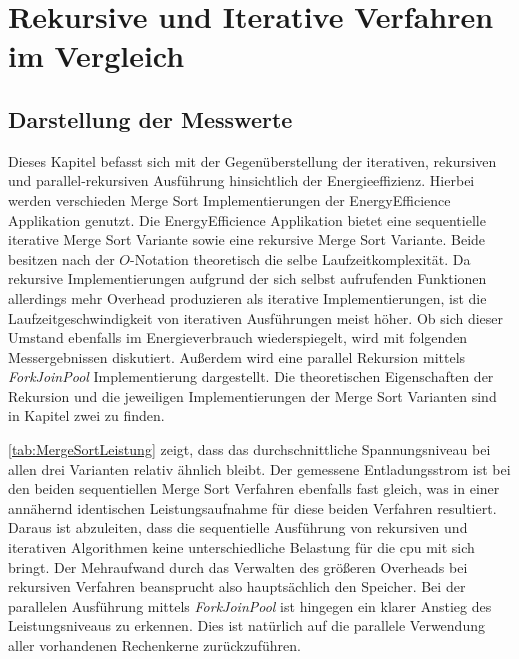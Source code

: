 \chapter{Rekursive und Iterative Verfahren im Vergleich}

\section{Darstellung der Messwerte}
Dieses Kapitel befasst sich mit der Gegenüberstellung der iterativen, rekursiven und parallel-rekursiven Ausführung hinsichtlich der Energieeffizienz. Hierbei werden verschieden Merge Sort Implementierungen der \glqq EnergyEfficience\grqq{} Applikation genutzt. Die \glqq EnergyEfficience\grqq{} Applikation bietet eine sequentielle iterative Merge Sort Variante sowie eine rekursive Merge Sort Variante. Beide besitzen nach der $O$-Notation theoretisch die selbe Laufzeitkomplexität. Da rekursive Implementierungen aufgrund der sich selbst aufrufenden Funktionen allerdings mehr Overhead produzieren als iterative Implementierungen, ist die Laufzeitgeschwindigkeit von iterativen Ausführungen meist höher. Ob sich dieser Umstand ebenfalls im Energieverbrauch wiederspiegelt, wird mit folgenden Messergebnissen diskutiert. Außerdem wird eine parallel Rekursion mittels \emph{ForkJoinPool} Implementierung dargestellt. Die theoretischen Eigenschaften der Rekursion und die jeweiligen Implementierungen der Merge Sort Varianten sind in Kapitel zwei zu finden.

\autoref{tab:MergeSortLeistung} zeigt, dass das durchschnittliche Spannungsniveau bei allen drei Varianten relativ ähnlich bleibt. Der gemessene Entladungsstrom ist bei den beiden sequentiellen Merge Sort Verfahren ebenfalls fast gleich, was in einer annähernd identischen Leistungsaufnahme für diese beiden Verfahren resultiert. Daraus ist abzuleiten, dass die sequentielle Ausführung von rekursiven und iterativen Algorithmen keine unterschiedliche Belastung für die \ac{cpu} mit sich bringt. Der Mehraufwand durch das Verwalten des größeren Overheads bei rekursiven Verfahren beansprucht also hauptsächlich den Speicher. Bei der parallelen Ausführung mittels \emph{ForkJoinPool} ist hingegen ein klarer Anstieg des Leistungsniveaus zu erkennen. Dies ist natürlich auf die parallele Verwendung aller vorhandenen Rechenkerne zurückzuführen.



